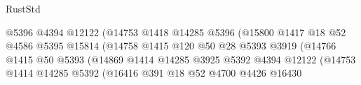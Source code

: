 \begin{lexlean}{RustStd}
\begin{coremodule}
                                                @5396
                                                @4394
                                                @12122
                                                (@14753
                                                  @1418
                                                  @14285
                                                  @5396
                                                  (@15800
                                                    @1417
                                                    @18
                                                    @52
                                                    @4586
                                                    @5395
                                                    @15814
                                                    (@14758
                                                      @1415
                                                      @120
                                                      @50
                                                      @28
                                                      @5393
                                                      @3919
                                                      (@14766
                                                        @1415
                                                        @50
                                                        @5393
                                                        (@14869
                                                          @1414
                                                          @14285
                                                          @3925
                                                          @5392
                                                          @4394
                                                          @12122
                                                          (@14753
                                                            @1414
                                                            @14285
                                                            @5392
                                                            (@16416
                                                              @391
                                                              @18
                                                              @52
                                                              @4700
                                                              @4426
                                                              @16430

\end{coremodule}
\end{lexlean}
